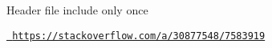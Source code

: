 
\begin{DoxyItemize}
\item Header file include only once

\href{https://stackoverflow.com/a/30877548/7583919}{\texttt{ https\+://stackoverflow.\+com/a/30877548/7583919}} 
\end{DoxyItemize}